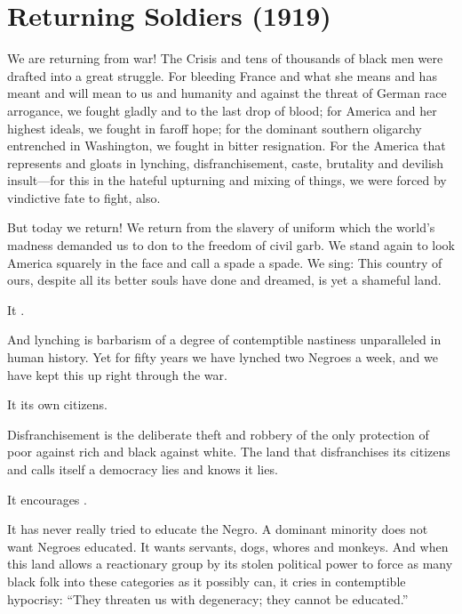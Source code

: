 \documentclass[letterpaper,10pt,english]{jupyterBook}
\begin{document}
\section{Returning Soldiers (1919)}
\label{\detokenize{Volumes/18/01/returning_soldiers:returning-soldiers-1919}}\label{\detokenize{Volumes/18/01/returning_soldiers::doc}}
\sphinxAtStartPar
We are returning from war! The Crisis and tens of thousands of black men were drafted into a great struggle. For bleeding France and what she means and has meant and will mean to us and humanity and against the threat of German race arrogance, we fought gladly and to the last drop of blood; for America and her highest ideals, we fought in far\sphinxhyphen{}off hope; for the dominant southern oligarchy entrenched in Washington, we fought in bitter resignation. For the America that represents and gloats in lynching, disfranchisement, caste, brutality and devilish insult—for this in the hateful upturning and mixing of things, we were forced by vindictive fate to fight, also.

\sphinxAtStartPar
But today we return! We return from the slavery of uniform which the world’s madness demanded us to don to the freedom of civil garb. We stand again to look America squarely in the face and call a spade a spade. We sing: This country of ours, despite all its better souls have done and dreamed, is yet a shameful land.

\sphinxAtStartPar
It .

\sphinxAtStartPar
And lynching is barbarism of a degree of contemptible nastiness unparalleled in human history. Yet for fifty years we have lynched two Negroes a week, and we have kept this up right through the war.

\sphinxAtStartPar
It  its own citizens.

\sphinxAtStartPar
Disfranchisement is the deliberate theft and robbery of the only protection of poor against rich and black against white. The land that disfranchises its citizens and calls itself a democracy lies and knows it lies.

\sphinxAtStartPar
It encourages .

\sphinxAtStartPar
It has never really tried to educate the Negro. A dominant minority does not want Negroes educated. It wants servants, dogs, whores and monkeys. And when this land allows a reactionary group by its stolen political power to force as many black folk into these categories as it possibly can, it cries in contemptible hypocrisy: “They threaten us with degeneracy; they cannot be educated.”
\end{document}
